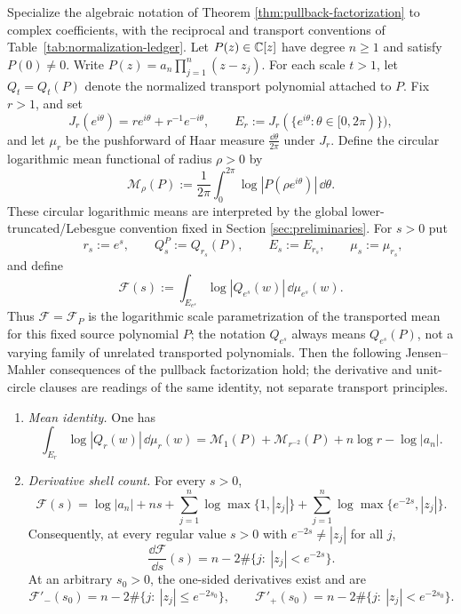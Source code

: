 \begin{theorem}\label{thm:leyang-mahler-transport}
Specialize the algebraic notation of Theorem \ref{thm:pullback-factorization} to complex coefficients, with the reciprocal and transport conventions of Table~\ref{tab:normalization-ledger}.  Let \(P(z)\in\mathbb{C}[z]\) have degree \(n\ge 1\) and satisfy \(P(0)\neq 0\).  Write \(P(z)=a_n\prod_{j=1}^{n}(z-z_j)\).  For each scale \(t>1\), let \(Q_t=Q_t(P)\) denote the normalized transport polynomial attached to \(P\).  Fix \(r>1\), and set
\[
J_r(e^{i\theta})=r e^{i\theta}+r^{-1}e^{-i\theta},
\qquad
E_r:=J_r(\{e^{i\theta}:\theta\in[0,2\pi)\}),
\]
and let \(\mu_r\) be the pushforward of Haar measure \(\frac{\dd\theta}{2\pi}\) under \(J_r\).  Define the circular logarithmic mean functional of radius \(\rho>0\) by
\[
\mathcal M_\rho(P):=\frac1{2\pi}\int_{0}^{2\pi}\log|P(\rho e^{i\theta})|\,\dd\theta.
\]
These circular logarithmic means are interpreted by the global lower-truncated/Lebesgue convention fixed in Section \ref{sec:preliminaries}.
For \(s>0\) put
\[
\qquad
r_s:=e^s,\qquad
Q_s^P:=Q_{r_s}(P),\qquad
E_s:=E_{r_s},\qquad
\mu_s:=\mu_{r_s},
\]
and define
\[
\mathcal F(s):=\int_{E_{e^s}}\log|Q_{e^s}(w)|\,\dd\mu_{e^s}(w).
\]
Thus \(\mathcal F=\mathcal F_P\) is the logarithmic scale
parametrization of the transported mean for this fixed source
polynomial \(P\); the notation \(Q_{e^s}\) always means \(Q_{e^s}(P)\),
not a varying family of unrelated transported polynomials.
Then the following Jensen--Mahler consequences of the pullback factorization hold; the derivative and unit-circle clauses are readings of the same identity, not separate transport principles.
\begin{enumerate}[label=\textup{(\alph*)}]
\item \emph{Mean identity.}  One has
\[
\boxed{\;
\int_{E_r}\log|Q_r(w)|\,\dd\mu_r(w)
=
\mathcal M_{1}(P)+\mathcal M_{r^{-2}}(P)+n\log r-\log|a_n|.
\;}
\]
\item \emph{Derivative shell count.}  For every \(s>0\),
\[
\mathcal F(s)=\log|a_n|+ns+
\sum_{j=1}^{n}\log\max\{1,|z_j|\}+
\sum_{j=1}^{n}\log\max\{e^{-2s},|z_j|\}.
\]
Consequently, at every regular value \(s>0\) with \(e^{-2s}\ne |z_j|\) for all \(j\),
\[
\frac{\dd\mathcal F}{\dd s}(s)=n-2\#\{j:\ |z_j|<e^{-2s}\}.
\]
At an arbitrary \(s_0>0\), the one-sided derivatives exist and are
\[
\mathcal F'_-(s_0)
=n-2\#\{j:\ |z_j|\le e^{-2s_0}\},
\qquad
\mathcal F'_+(s_0)
=n-2\#\{j:\ |z_j|< e^{-2s_0}\}.
\]
\end{enumerate}
\end{theorem}
